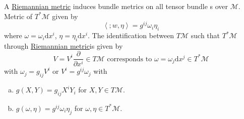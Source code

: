 A \hyperref[def:Riemannian-metric]{Riemannian metric} induces bundle metrics on all tensor bundle s over \(\mathcal{M} \). Metric of \(T^{\ast} \mathcal{M} \) given by
\[
	\left\langle ;w, \eta \right\rangle = g^{ij} \omega _i \eta _i
\]
where \(\omega = \omega _i \mathrm{d} x^i\), \(\eta = \eta _i \mathrm{d} x^i\). The identification between \(T\mathcal{M} \) such that \(T^{\ast} \mathcal{M} \) through \hyperref[def:Riemannian-metric]{Riemannian metric}is given by
\[
	V = V^i \frac{\partial }{\partial x^i} \in T \mathcal{M} \text{ corresponds to } \omega = \omega _j \mathrm{d} x^j \in T^{\ast} \mathcal{M}
\]
with \(\omega _j = g_{ij} V^i\) or \(V^i = g^{ij} \omega _j\) with
\begin{enumerate}[(a)]
	\item \(g(X, Y) = g_{ij}X^i Y_i \) for \(X, Y\in T \mathcal{M} \).
	\item \(g(\omega , \eta ) = g^{ij} \omega _i \eta _j\) for \(\omega , \eta \in T^{\ast} \mathcal{M} \).
\end{enumerate}